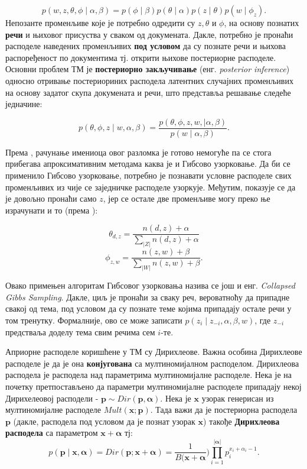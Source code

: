 \begin{equation}
p(w,z,\theta,\phi \mid \alpha,\beta) = p(\phi \mid \beta)p(\theta \mid \alpha)p(z \mid \theta)p(w \mid \phi_z).
\end{equation}
Непозанте променљиве које је потребно одредити су $z,\theta$ и $\phi$, на основу познатих  \textbf{речи} и њиховог присуства у сваком од докумената. Дакле, потребно је пронаћи расподеле наведених променљивих \textbf{под условом} да су познате речи и њихова распоређеност по документима тј. открити њихове постериорне расподеле.
Основни проблем ТМ је \textbf{постериорно закључивање} (енг. \textit{posterior inference}) односно отривање постериориних расподела латентних случајних променљивих на основу задатог скупа докумената и речи, што представља решавање следеће једначине:

\begin{equation}
p(\theta,\phi,z \mid w,\alpha,\beta) =\frac{p(\theta,\phi,z,w,\mid \alpha,\beta)}{p(w \mid \alpha,\beta)}.
\end{equation}

Према  \cite{verov9}, рачунање имениоца овог разломка је готово немогуће па се стога прибегава апроксимативним методама каква је и Гибсово узорковање. Да би се применило Гибсово узорковање, потребно је познавати  условне расподеле свих променљивих из чије се заједничке расподеле узоркује. Међутим, показује се да је довољно пронаћи само $z$, јер се остале две променљиве могу преко ње израчунати и то (према \cite{verov9}):

$$
\theta_{d,z} = \frac{n(d,z)+\alpha}{\sum_{|Z|}n(d,z)+\alpha}
$$
$$
\phi_{z,w} = \frac{n(z,w)+\beta}{\sum_{|W|}n(z,w)+\beta}.
$$
 
Овако примењен алгоритам Гибсовог узорковања назива се још и енг. \textit{Collapsed Gibbs Sampling}. Дакле, циљ је пронаћи за сваку реч, вероватноћу да припадне свакој од тема, под условом да су познате теме којима припадају остале речи у том тренутку. Формалније, ово се може записати $ p(z_i \mid z_{-i},\alpha,\beta,w)$, где $ z_{-i}$ предстваља доделу тема свим речима сем $i$-те. 

Априорне расподеле коришћене у ТМ су Дирихлеове. Важна особина Дирихлеове расподеле је да је она \textbf{конјугована} са мултиномијалном расподелом. Дирихлеова расподела је расподела над параметрима мултиномијалне расподеле. Нека је на почетку претпостављено да параметри мултиномијалне расподеле припадају некој Дирихелеовој расподели - $\mathbf{p} \sim Dir(\mathbf{p,\alpha})$. Нека је $\mathbf{x}$ узорак генерисан из мултиномијалне расподеле $Mult(\mathbf{x;p})$. Тада важи да је постериорна расподела $\mathbf{p}$ (дакле, расподела под условом да је познат узорак  $\mathbf{x}$) такође \textbf{Дирихлеова расподела} са параметром $\mathbf{x+\alpha}$ тј:
\begin{equation}
p(\mathbf{p\mid x,\alpha}) = Dir(\mathbf{p;x+\alpha}) = \frac{1}{B(\mathbf{x+\alpha}})\prod_{i=1}^{|\mathbf{\alpha}|} p_i^{x_i+\alpha_i-1}.
\end{equation}

